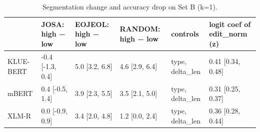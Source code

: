 \begin{table}
\caption{Segmentation change and accuracy drop on Set B (k=1).}
\label{tab:table5_mediation}
\begin{tabular}{llllll}
\toprule
 & JOSA: high − low & EOJEOL: high − low & RANDOM: high − low & controls & logit coef of edit\_norm (z) \\
\midrule
KLUE-BERT & -0.4 [-1.3, 0.4] & 5.0 [3.2, 6.8] & 4.6 [2.9, 6.4] & type, delta\_len & 0.41 [0.34, 0.48] \\
mBERT & 0.4 [-0.5, 1.4] & 3.9 [2.3, 5.5] & 3.5 [2.1, 5.0] & type, delta\_len & 0.31 [0.25, 0.37] \\
XLM-R & 0.0 [-0.9, 0.9] & 3.4 [2.0, 4.8] & 1.2 [0.0, 2.4] & type, delta\_len & 0.36 [0.28, 0.44] \\
\bottomrule
\end{tabular}
\end{table}
